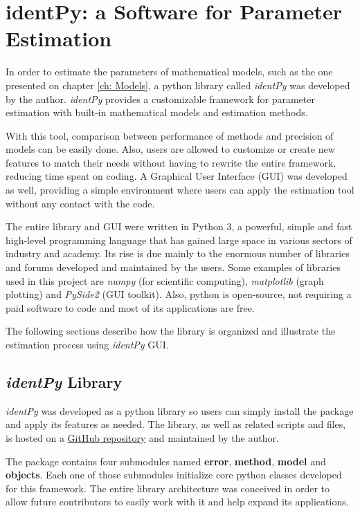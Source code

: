 \chapter{identPy: a Software for Parameter Estimation}
\label{ch: Software}

In order to estimate the parameters of mathematical models, such as the one presented on chapter \ref{ch: Models}, a python library called \textit{identPy} was developed by the author. \textit{identPy} provides a customizable framework for parameter estimation with built-in mathematical models and estimation methods. 

With this tool, comparison between performance of methods and precision of models can be easily done. Also, users are allowed to customize or create new features to match their needs without having to rewrite the entire framework, reducing time spent on coding. A Graphical User Interface (GUI) was developed as well, providing a simple environment where users can apply the estimation tool without any contact with the code.

The entire library and GUI were written in Python 3, a powerful, simple and fast high-level programming language that has gained large space in various sectors of industry and academy. Its rise is due mainly to the enormous number of libraries and forums developed and maintained by the users. Some examples of libraries used in this project are \textit{numpy} (for scientific computing), \textit{matplotlib} (graph plotting) and \textit{PySide2} (GUI toolkit). Also, python is open-source, not requiring a paid software to code and most of its applications are free.

The following sections describe how the library is organized and illustrate the estimation process using \textit{identPy} GUI.

\section{\textit{identPy} Library}

\textit{identPy} was developed as a python library so users can simply install the package and apply its features as needed. The library, as well as related scripts and files, is hosted on a \href{https://github.com/gnegrelli/identPy}{GitHub repository} and maintained by the author.

The package contains four submodules named \textbf{error}, \textbf{method}, \textbf{model} and \textbf{objects}. Each one of those submodules initialize core python classes developed for this framework. The entire library architecture was conceived in order to allow future contributors to easily work with it and help expand its applications.


